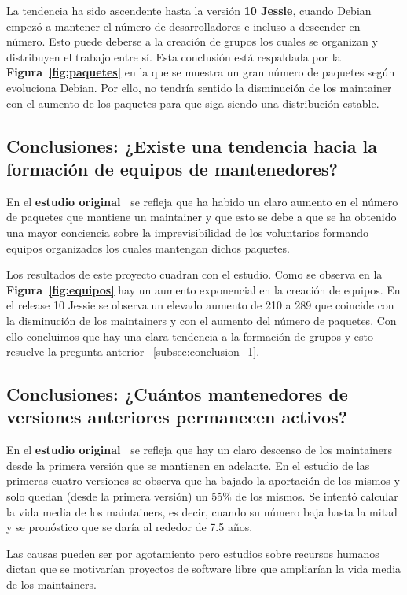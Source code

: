 \documentclass[a4paper, 12pt]{book}
\begin{document}
La tendencia ha sido ascendente hasta la versión \textbf{10 Jessie}, cuando Debian empezó a mantener el número de desarrolladores e incluso a descender en número. Esto puede deberse a la creación de grupos los cuales se organizan y distribuyen el trabajo entre sí. Esta conclusión está respaldada por la \textbf{Figura~\ref{fig:paquetes}} en la que se muestra un gran número de paquetes según evoluciona Debian. Por ello, no tendría sentido la disminución de los maintainer con el aumento de los paquetes para que siga siendo una distribución estable. 

\subsection{Conclusiones: ¿Existe una tendencia hacia la formación de equipos de mantenedores?}
\label{subsec:conclusion_2}
En el \textbf{estudio original~\cite{robles05:_debian}} se refleja que ha habido un claro aumento en el número de paquetes que mantiene un maintainer y que esto se debe a que se ha obtenido una mayor conciencia sobre la imprevisibilidad de los voluntarios formando equipos organizados los cuales mantengan dichos paquetes.

Los resultados de este proyecto cuadran con el estudio. Como se observa en la \textbf{Figura~\ref{fig:equipos}} hay un aumento exponencial en la creación de equipos. En el release 10 Jessie se observa un elevado aumento de 210 a 289 que coincide con la disminución de los maintainers y con el aumento del número de paquetes. Con ello concluimos que hay una clara tendencia a la formación de grupos y esto resuelve la pregunta anterior ~\ref{subsec:conclusion_1}.

\subsection{Conclusiones: ¿Cuántos mantenedores de versiones anteriores permanecen activos?}
\label{subsec:conclusion_3}
En el \textbf{estudio original~\cite{robles05:_debian}} se refleja que hay un claro descenso de los maintainers desde la primera versión que se mantienen en adelante. 
En el estudio de las primeras cuatro versiones se observa que ha bajado la aportación de los mismos y solo quedan (desde la primera versión) un 55\% de los mismos. Se intentó calcular la vida media de los maintainers, es decir, cuando su número baja hasta la mitad y se pronóstico que se daría al rededor de 7.5 años.

Las causas pueden ser por agotamiento pero estudios sobre recursos humanos dictan que se motivarían proyectos de software libre que ampliarían la vida media de los maintainers. 
\end{document}
